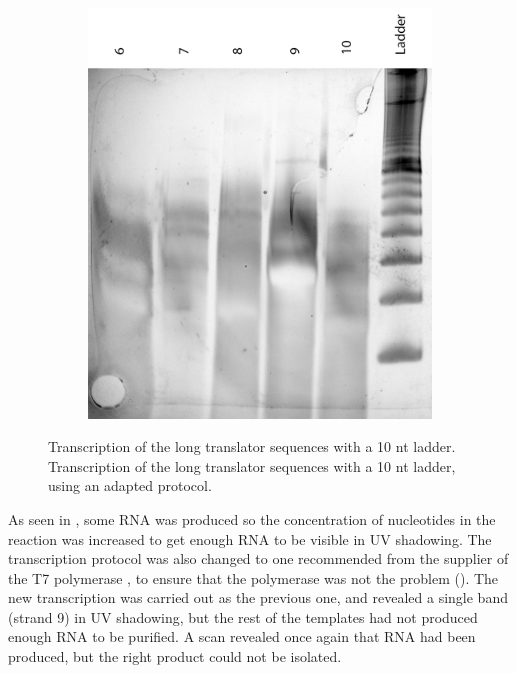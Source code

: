 \begin{figure}[h]
\begin{subfigure}[t]{0.49\textwidth}
  \includegraphics[width=\textwidth]{images/translator_transcription_long_2.png}
  \caption{}
  \label{translator_transcription_long_2}
\end{subfigure}
\caption{ Transcription of the long translator sequences with a 10 nt ladder.  Transcription of the long translator sequences with a 10 nt ladder, using an adapted protocol.}
\end{figure}

As seen in , some RNA was produced so the concentration of nucleotides in the reaction was increased to get enough RNA to be visible in UV shadowing. The transcription protocol was also changed to one recommended from the supplier of the T7 polymerase \cite{nebtranscription}, to ensure that the polymerase was not the problem (). The new transcription was carried out as the previous one, and revealed a single band (strand 9) in UV shadowing, but the rest of the templates had not produced enough RNA to be purified. A scan revealed once again that RNA had been produced, but the right product could not be isolated.

